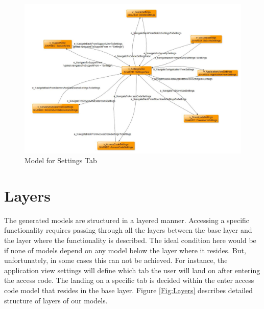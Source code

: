 \begin{figure} [htbp!]
	\centering
					\includegraphics[width=1\textwidth]{figures/Settings_model_screenshot}
					\caption{\label{Fig:Settings_model_screenshot} Model for Settings Tab}
\end{figure}

\section{Layers}
\par
The generated models are structured in a layered manner. Accessing a specific functionality requires passing through all the layers between the base layer and the layer where the functionality is described. The ideal condition here would be if none of models depend on any model below the layer where it resides. But, unfortunately, in some cases this can not be achieved. For instance, the application view settings will define which tab the user will land on after entering the access code. The landing on a specific tab is decided within the enter access code model that resides in the base layer. Figure \ref{Fig:Layers} describes detailed structure of layers of our models.

